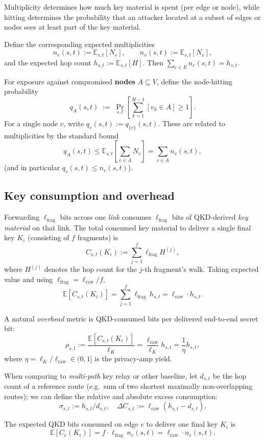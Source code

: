\documentclass[journal]{IEEEtran}
\begin{document}
Multiplicity determines how much key material is spent (per edge or node), while hitting determines the probability that an attacker located at a subset of edges or nodes sees at least part of the key material.


Define the corresponding expected multiplicities
$$
n_e(s,t):=\mathbb{E}_{s,t}[N_e],\qquad n_v(s,t):=\mathbb{E}_{s,t}[N_v],
$$
and the expected hop count $h_{s,t}:=\mathbb{E}_{s,t}[H]$. Then $\sum_{e\in E} n_e(s,t)=h_{s,t}$.

For exposure against compromised \textbf{nodes} $A\subseteq V$, define the node-hitting probability
$$
q_A(s,t)\;:=\;\Pr_{s,t}\!\left[\sum_{k=1}^{H-1}[v_k\in A]\ge 1\right].
$$
For a single node $v$, write $q_v(s,t):=q_{\{v\}}(s,t)$. These are related to multiplicities by the standard bound
$$
q_A(s,t)
\le
\mathbb{E}_{s,t}\!\left[\sum_{v\in A}N_v\right]
=
\sum_{v\in A} n_v(s,t),
$$
(and in particular $q_v(s,t)\le n_v(s,t)$).

\subsection*{Key consumption and overhead}

Forwarding $\ell_\text{frag}$ bits across one \textit{link} consumes $\ell_\text{frag}$ bits of QKD-derived \textit{key material} on that link. The total consumed key material to deliver a single final key $K_i$ (consisting of $f$ fragments) is
$$
C_{s,t}(K_i) := \sum_{j=1}^f \ell_\text{frag} H^{(j)},
$$
where $H^{(j)}$ denotes the hop count for the $j$-th fragment's walk.
Taking expected value and using $\ell_\text{frag}=\ell_\text{raw}/f$,
$$
\mathbb{E}[C_{s,t}(K_i)]
=\sum_{j=1}^{f}\ell_{\mathrm{frag}}\,h_{s,t}
=\ell_{\mathrm{raw}}\cdot h_{s,t}.
$$

A natural \textit{overhead} metric is QKD-consumed bits per delivered end-to-end secret bit:
$$
\rho_{s,t}:=\frac{\mathbb{E}[C_{s,t}(K_i)]}{\ell_K}
=\frac{\ell_{\mathrm{raw}}}{\ell_K}h_{s,t}
=\frac{1}{\eta}h_{s,t},
$$
where $\eta=\ell_K/\ell_\text{raw} \in (0,1]$ is the privacy-amp yield.

When comparing to \textit{multi-path} key relay or other baseline, let $d_{s,t}$ be the hop count of a reference route (e.g.\ sum of two shortest maximally non-overlapping routes); we can define the relative and absolute excess consumption:
$$
\sigma_{s,t}:=h_{s,t}/d_{s,t},\quad \Delta C_{s,t}:=\ell_\text{raw}(h_{s,t}-d_{s,t}).
$$

The expected QKD bits consumed on edge $e$ to deliver one final key $K_i$ is
$$
\mathbb{E}[C_e(K_i)]
= f \cdot \ell_{\mathrm{frag}}\,n_e(s,t)
= \ell_{\mathrm{raw}} \cdot n_e(s,t).
$$
\end{document}
